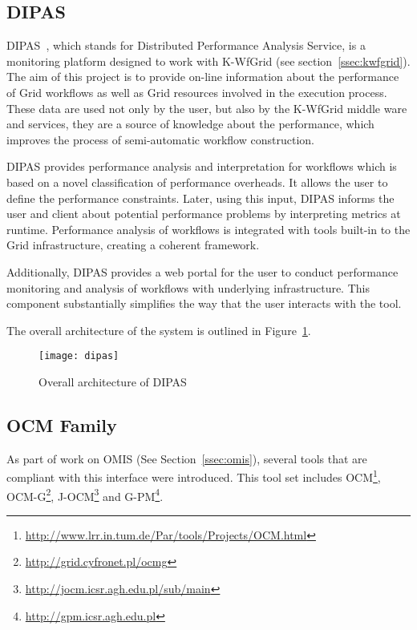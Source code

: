 
\subsection{DIPAS}

DIPAS~\cite{DIPAS}, which stands for Distributed Performance Analysis Service, is a monitoring platform designed to work with K-WfGrid (see section~\ref{ssec:kwfgrid}). The aim of this project is to provide on-line information about the performance of Grid workflows as well as Grid resources involved in the execution process. These data are used not only by the user, but also by the K-WfGrid middle ware and services, they are a source of knowledge about the performance, which improves the process of semi-automatic workflow construction.

DIPAS provides performance analysis and interpretation for workflows which is based on a novel classification of performance overheads. It allows the user to define the performance constraints. Later, using this input, DIPAS informs the user and client about potential performance problems by interpreting metrics at runtime. Performance analysis of workflows is integrated with tools built-in to the Grid infrastructure, creating a coherent framework.

Additionally, DIPAS provides a web portal for the user to conduct performance monitoring and analysis of workflows with underlying infrastructure. This component substantially simplifies the way that the user interacts with the tool.

The overall architecture of the system is outlined in Figure~\ref{fig:dipas}.

\begin{figure}[ht]
\centering
\texttt{[image: dipas]} 
\caption{Overall architecture of DIPAS} 
\label{fig:dipas}
\end{figure}


\subsection{OCM Family}

As part of work on OMIS (See Section~\ref{ssec:omis}), several tools that are compliant with this interface were introduced. This tool set includes OCM\footnote{\url{http://www.lrr.in.tum.de/Par/tools/Projects/OCM.html}}, OCM-G\footnote{\url{http://grid.cyfronet.pl/ocmg}}, J-OCM\footnote{\url{http://jocm.icsr.agh.edu.pl/sub/main}} and G-PM\footnote{\url{http://gpm.icsr.agh.edu.pl}}.

